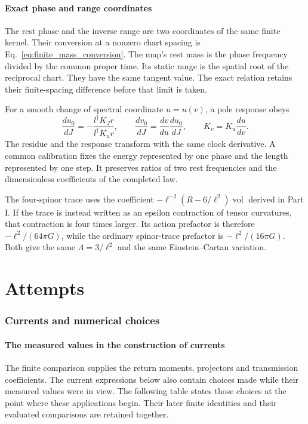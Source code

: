 \documentclass[aps,prx,onecolumn,10pt,notitlepage,nofootinbib,longbibliography]{revtex4-2}
\numberwithin{equation}{section}
\numberwithin{table}{section}
\begin{document}
\subsection{Exact phase and range coordinates}
The rest phase and the inverse range are two coordinates of the same finite
kernel. Their conversion at a nonzero chart spacing is
Eq.~\eqref{eq:finite_mass_conversion}. The map's rest mass is the phase
frequency divided by the common proper time. Its static range is the
spatial root of the reciprocal chart. They have the same tangent value.
The exact relation retains their finite-spacing difference before that limit
is taken.

For a smooth change of spectral coordinate $u=u(v)$, a pole response obeys
\begin{equation}
 \frac{du_0}{dJ}
 =-\frac{l^\dagger K_Jr}{l^\dagger K_ur},\qquad
 \frac{dv_0}{dJ}
 =\frac{dv}{du}\frac{du_0}{dJ},\qquad
 K_v=K_u\frac{du}{dv}.
 \label{eq:coordinatecovariance}
\end{equation}
The residue and the response transform with the same clock derivative.
A common calibration fixes the energy represented by one phase and the
length represented by one step. It preserves ratios of two rest frequencies
and the dimensionless coefficients of the completed law.

The four-spinor trace uses the coefficient
$-\ell^{-2}(R-6/\ell^2)\operatorname{vol}$ derived in Part I.
If the trace is instead written as an epsilon contraction of tensor
curvatures, that contraction is four times larger. Its action prefactor is
therefore $-\ell^2/(64\pi G)$, while the ordinary spinor-trace prefactor
is $-\ell^2/(16\pi G)$. Both give the same $\Lambda=3/\ell^2$ and
the same Einstein--Cartan variation.

\part{Attempts}\label{part:attempts}

\section{Currents and numerical choices}
\label{sec:attemptchoices}

\subsection{The measured values in the construction of currents}
\label{sec:measurementfactors}
The finite comparison supplies the return moments, projectors and transmission
coefficients. The current expressions below also contain choices made while
their measured values were in view. The following table states those choices
at the point where these applications begin. Their later finite identities
and their evaluated comparisons are retained together.
\end{document}
